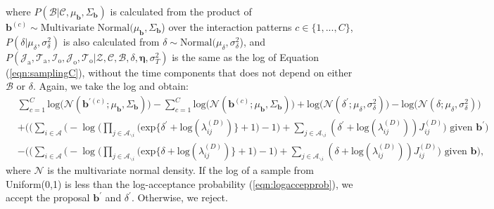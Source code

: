    where $P(\mathcal{B}|\mathcal{C}, \mu_{\boldsymbol{b}}, \Sigma_{\boldsymbol{b}})$ is calculated from the product of $\boldsymbol{b}^{(c)}\sim \mbox{Multivariate Normal}(\mu_{\boldsymbol{b}}, \Sigma_{\boldsymbol{b}}$) over the interaction patterns $c \in \{1,...,C\}$,  $P(\delta|\mu_\delta, \sigma^2_\delta)$ is also calculated from $\delta \sim \mbox{Normal}(\mu_\delta, \sigma^2_\delta$), and $P(\mathcal{J}_{\mbox{a}}, \mathcal{T}_{\mbox{a}},\mathcal{I}_{\mbox{o}}, \mathcal{J}_{\mbox{o}}, \mathcal{T}_{\mbox{o}} |\mathcal{Z}, \mathcal{C}, \mathcal{B}, \delta, \boldsymbol{\eta}, \sigma_T^2)$ is the same as the log of Equation (\ref{eqn:samplingC}), without the time components that does not depend on either $\mathcal{B}$ or $\delta$. Again, we take the log and obtain:
   \begin{equation}
   \begin{aligned} 
   &\sum_{c=1}^C\mbox{log}\Big(\mathcal{N}(\boldsymbol{b}^{\prime(c)};\mu_{\boldsymbol{b}}, \Sigma_{\boldsymbol{b}})\Big)-\sum_{c=1}^C\mbox{log}\Big(\mathcal{N}(\boldsymbol{b}^{(c)};\mu_{\boldsymbol{b}}, \Sigma_{\boldsymbol{b}})\Big)+\mbox{log}\Big(\mathcal{N}(\delta^\prime;\mu_\delta, \sigma^2_\delta)\Big)-\mbox{log}\Big(\mathcal{N}(\delta; \mu_\delta, \sigma^2_\delta)\Big)\\&+ \Bigg(\Big(\sum_{i\in \mathcal{A}}\Big(-\log\Big(\prod_{j \in \mathcal{A}_{\backslash i}} \Big(\mbox{exp}\{\delta^\prime+\mbox{log}(\lambda_{ij}^{(D)})\} + 1\Big)-1\Big) + \sum_{j \in \mathcal{A}_{\backslash i}} (\delta^\prime+\mbox{log}(\lambda_{ij}^{(D)}))J_{ij}^{(D)}\Big)\mbox{ given }  \boldsymbol{b}^\prime\Bigg)
   \\& -\Bigg(\Big(\sum_{i\in \mathcal{A}}\Big(-\log\Big(\prod_{j \in \mathcal{A}_{\backslash i}} \Big(\mbox{exp}\{\delta+\mbox{log}(\lambda_{ij}^{(D)})\} + 1\Big)-1\Big) + \sum_{j \in \mathcal{A}_{\backslash i}} (\delta+\mbox{log}(\lambda_{ij}^{(D)}))J_{ij}^{(D)}\Big)\mbox{ given }  \boldsymbol{b}\Bigg),
   \end{aligned}\label{eqn:logaccepprob}
   \end{equation}
   where $\mathcal{N}$ is the multivariate normal density. If the log of a sample from Uniform(0,1) is less than the log-acceptance probability (\ref{eqn:logaccepprob}), we accept the proposal $\boldsymbol{b}^\prime$ and $\delta^\prime$. Otherwise, we reject.
